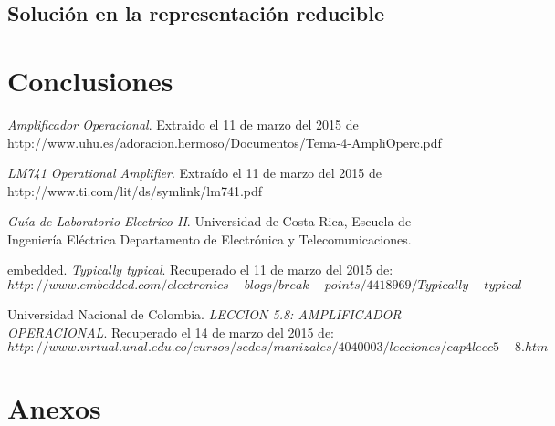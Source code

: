 \documentclass[11pt,letterpaper]{article}     %
\begin{document}
\subsection{Solución en la representación reducible}


\section{Conclusiones}

\newpage

\begin{thebibliography}{}


 \emph{Amplificador Operacional}. 
Extraido el 11 de marzo del 2015 de
http://www.uhu.es/adoracion.hermoso/Documentos/Tema-4-AmpliOperc.pdf

  \emph{LM741 Operational Amplifier}. Extraído el 11 de marzo del 2015 de
http://www.ti.com/lit/ds/symlink/lm741.pdf


 \emph{Guía de Laboratorio Electrico II}. Universidad de Costa Rica, Escuela de Ingeniería Eléctrica
Departamento de Electrónica y Telecomunicaciones.


 embedded. \emph{Typically typical}. Recuperado el 11 de marzo del 2015 de: $http://www.embedded.com/electronics-blogs/break-points/4418969/Typically-typical$


 Universidad Nacional de Colombia. \emph{LECCION 5.8: AMPLIFICADOR OPERACIONAL}. Recuperado el 14 de marzo del 2015 de: $http://www.virtual.unal.edu.co/cursos/sedes/manizales/4040003/lecciones/cap4lecc5-8.htm$

\end{thebibliography}


\appendix
\section{Anexos}


%


\end{document}
